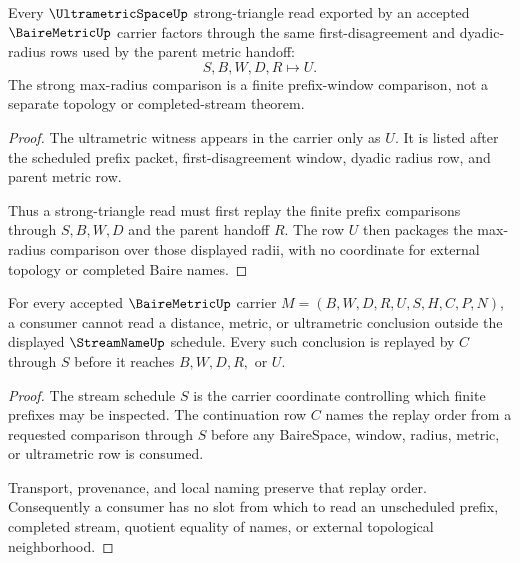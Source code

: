 \begin{theorem}
\label{thm:bairemetric-ultrametricspace-strong-triangle-handoff}
Every $\UltrametricSpaceUp$ strong-triangle read exported by an accepted $\BaireMetricUp$ carrier factors through the same first-disagreement and dyadic-radius rows used by the parent metric handoff:
$$
S,B,W,D,R \longmapsto U .
$$
The strong max-radius comparison is a finite prefix-window comparison, not a separate topology or completed-stream theorem.
\end{theorem}
\begin{proof}
The ultrametric witness appears in the carrier only as $U$. It is listed after the scheduled prefix packet, first-disagreement window, dyadic radius row, and parent metric row.

Thus a strong-triangle read must first replay the finite prefix comparisons through $S,B,W,D$ and the parent handoff $R$. The row $U$ then packages the max-radius comparison over those displayed radii, with no coordinate for external topology or completed Baire names.
\end{proof}

\begin{theorem}
\label{thm:bairemetric-stream-schedule-nonescape}
For every accepted $\BaireMetricUp$ carrier $M=(B,W,D,R,U,S,H,C,P,N)$, a consumer cannot read a distance, metric, or ultrametric conclusion outside the displayed $\StreamNameUp$ schedule. Every such conclusion is replayed by $C$ through $S$ before it reaches $B,W,D,R,$ or $U$.
\end{theorem}
\begin{proof}
The stream schedule $S$ is the carrier coordinate controlling which finite prefixes may be inspected. The continuation row $C$ names the replay order from a requested comparison through $S$ before any BaireSpace, window, radius, metric, or ultrametric row is consumed.

Transport, provenance, and local naming preserve that replay order. Consequently a consumer has no slot from which to read an unscheduled prefix, completed stream, quotient equality of names, or external topological neighborhood.
\end{proof}

